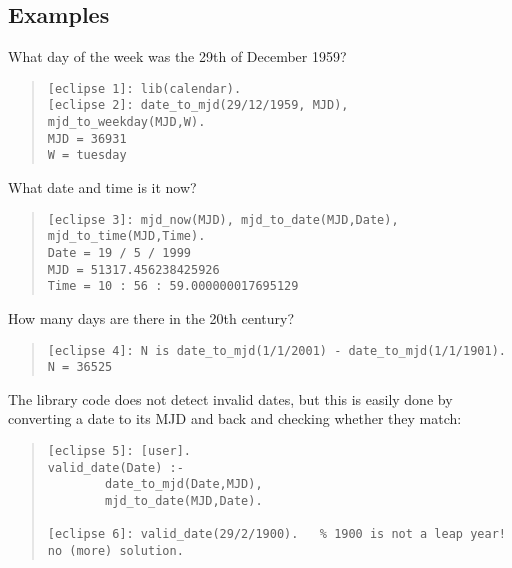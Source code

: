 \subsection{Examples}
What day of the week was the 29th of December 1959?
\begin{quote}\begin{verbatim}
[eclipse 1]: lib(calendar).
[eclipse 2]: date_to_mjd(29/12/1959, MJD), mjd_to_weekday(MJD,W).
MJD = 36931
W = tuesday
\end{verbatim}\end{quote}
What date and time is it now?
\begin{quote}\begin{verbatim}
[eclipse 3]: mjd_now(MJD), mjd_to_date(MJD,Date), mjd_to_time(MJD,Time).
Date = 19 / 5 / 1999
MJD = 51317.456238425926
Time = 10 : 56 : 59.000000017695129
\end{verbatim}\end{quote}
How many days are there in the 20th century?
\begin{quote}\begin{verbatim}
[eclipse 4]: N is date_to_mjd(1/1/2001) - date_to_mjd(1/1/1901).
N = 36525
\end{verbatim}\end{quote}
The library code does not detect invalid dates,
but this is easily done by converting a date to its MJD and back
and checking whether they match:
\begin{quote}\begin{verbatim}
[eclipse 5]: [user].
valid_date(Date) :-
        date_to_mjd(Date,MJD),
        mjd_to_date(MJD,Date).

[eclipse 6]: valid_date(29/2/1900).   % 1900 is not a leap year!
no (more) solution.
\end{verbatim}\end{quote}
